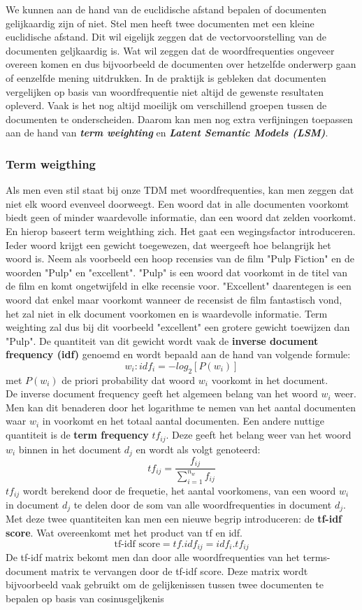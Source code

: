 We kunnen aan de hand van de euclidische afstand bepalen of documenten gelijkaardig zijn of niet. Stel men heeft twee documenten met een kleine euclidische afstand. Dit wil eigelijk zeggen dat de vectorvoorstelling van de documenten geljkaardig is. Wat wil zeggen dat de woordfrequenties ongeveer overeen komen en dus bijvoorbeeld de documenten over hetzelfde onderwerp gaan of eenzelfde mening uitdrukken.
%
In de praktijk is gebleken dat documenten vergelijken op basis van woordfrequentie niet altijd de gewenste resultaten opleverd. Vaak is het nog altijd moeilijk om verschillend groepen tussen de documenten te onderscheiden. Daarom kan men nog extra verfijningen toepassen aan de hand van \textbf{\textit{term weighting}} en \textbf{\textit{Latent Semantic Models (LSM)}}.


\subsubsection{Term weigthing}\label{Term weighting}

Als men even stil staat bij onze TDM met woordfrequenties, kan men zeggen dat niet elk woord evenveel doorweegt. Een woord dat in alle documenten voorkomt biedt geen of minder waardevolle informatie, dan een woord dat zelden voorkomt. En hierop baseert term weighthing zich. Het gaat een wegingsfactor introduceren. Ieder woord krijgt een gewicht toegewezen, dat weergeeft hoe belangrijk het woord is. Neem als voorbeeld een hoop recensies van de film "Pulp Fiction" en de woorden "Pulp" en "excellent". "Pulp" is een woord dat voorkomt in de titel van de film en komt ongetwijfeld in elke recensie voor. "Excellent" daarentegen is een woord dat enkel maar voorkomt wanneer de recensist de film fantastisch vond, het zal niet in elk document voorkomen en is waardevolle informatie. Term weighting zal dus bij dit voorbeeld "excellent" een grotere gewicht toewijzen dan "Pulp". 
%
De quantiteit van dit gewicht wordt vaak de \textbf{inverse document frequency  (idf)} genoemd en wordt bepaald aan de hand van volgende formule:
\[w_{i}: idf_{i} = -log_{2}[P(w_{i})] \]
met $P(w_{i})$ de priori probability dat woord $w_{i}$ voorkomt in het document.\\
%
De inverse document frequency geeft het algemeen belang van het woord $w_{i}$ weer. Men kan dit benaderen door het logarithme te nemen van het aantal documenten waar $w_{i}$ in voorkomt en het totaal aantal documenten.
Een andere nuttige quantiteit is de  \textbf{term frequency} $tf_{ij}$. Deze geeft het belang weer van het woord $w_{i}$ binnen in het document $d_{j}$  en wordt als volgt genoteerd:
\[ tf_{ij} = \frac{f_{ij}}{ \sum_{i=1}^{n_{w}}f_{ij}} \]
%
$tf_{ij}$ wordt berekend door de frequetie, het aantal voorkomens, van een woord $w_{i}$ in document $d_{j}$ te delen door de som van alle woordfrequenties in document $d_{j}$.
Met deze twee quantiteiten kan men een nieuwe begrip introduceren: de \textbf{tf-idf score}. Wat overeenkomt met het product van tf en idf.
\[ \text{tf-idf score} = tf . idf_{ij} = idf_{i} . tf_{ij} \]
%
De tf-idf matrix bekomt men dan door alle woordfrequenties van het terms-document matrix te vervangen door de tf-idf score.
Deze matrix wordt bijvoorbeeld vaak gebruikt om de gelijkenissen tussen twee documenten te bepalen op basis van cosinusgeljkenis
%
